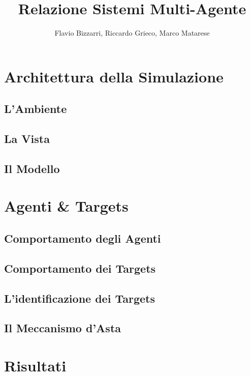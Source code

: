 \documentclass[12pt]{article}
\title{Relazione Sistemi Multi-Agente}
\author{Flavio Bizzarri, Riccardo Grieco, Marco Matarese}
\begin{document}

\newpage

\section{Architettura della Simulazione}
	\subsection{L'Ambiente}
	\subsection{La Vista}
	\subsection{Il Modello}

\section{Agenti \& Targets}
	\subsection{Comportamento degli Agenti}
	\subsection{Comportamento dei Targets}
	\subsection{L'identificazione dei Targets}
	\subsection{Il Meccanismo d'Asta}
	
\section{Risultati}


\newpage

\tableofcontents
\end{document}
